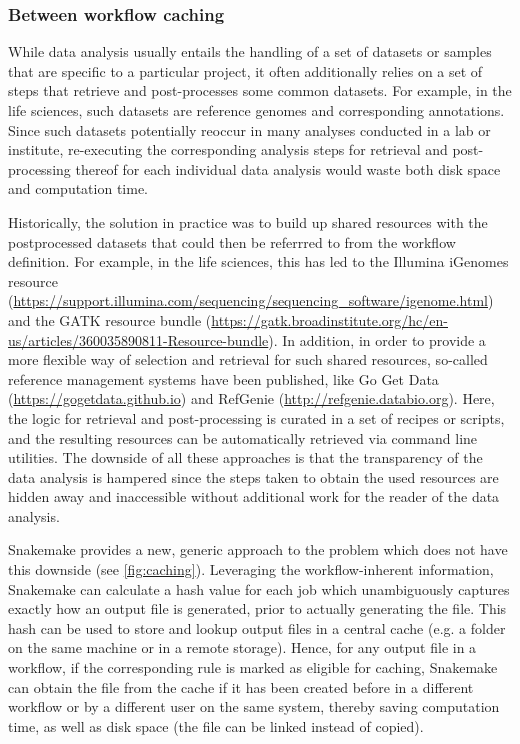 \documentclass[parskip=half]{scrartcl}
\let\plainurl\url
\renewcommand{\url}[1]{\protect\plainurl{#1}}
\begin{document}
\subsubsection{Between workflow caching}

While data analysis usually entails the handling of a set of datasets or samples that are specific to a particular project, it often additionally relies on a set of steps that retrieve and post-processes some common datasets.
For example, in the life sciences, such datasets are reference genomes and corresponding annotations.
Since such datasets potentially reoccur in many analyses conducted in a lab or institute, re-executing the corresponding analysis steps for retrieval and post-processing thereof for each individual data analysis would waste both disk space and computation time.

Historically, the solution in practice was to build up shared resources with the postprocessed datasets that could then be referrred to from the workflow definition.
For example, in the life sciences, this has led to the Illumina iGenomes resource (\url{https://support.illumina.com/sequencing/sequencing\_software/igenome.html}) and the GATK resource bundle (\url{https://gatk.broadinstitute.org/hc/en-us/articles/360035890811-Resource-bundle}).
In addition, in order to provide a more flexible way of selection and retrieval for such shared resources, so-called reference management systems have been published, like Go Get Data (\url{https://gogetdata.github.io}) and RefGenie (\url{http://refgenie.databio.org}).
Here, the logic for retrieval and post-processing is curated in a set of recipes or scripts, and the resulting resources can be automatically retrieved via command line utilities.
The downside of all these approaches is that the transparency of the data analysis is hampered since the steps taken to obtain the used resources are hidden away and inaccessible without additional work for the reader of the data analysis.

Snakemake provides a new, generic approach to the problem which does not have this downside (see \autoref{fig:caching}).
Leveraging the workflow-inherent information, Snakemake can calculate a hash value for each job which unambiguously captures exactly how an output file is generated, prior to actually generating the file.
This hash can be used to store and lookup output files in a central cache (e.g. a folder on the same machine or in a remote storage).
Hence, for any output file in a workflow, if the corresponding rule is marked as eligible for caching, Snakemake can obtain the file from the cache if it has been created before in a different workflow or by a different user on the same system, thereby saving computation time, as well as disk space (the file can be linked instead of copied).
\end{document}
